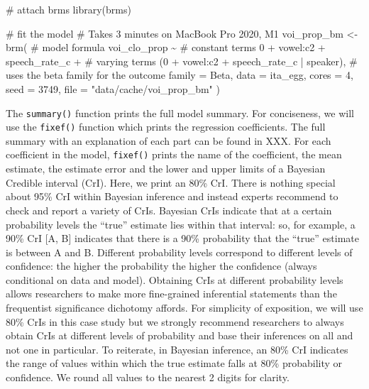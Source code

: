 \documentclass[
  authoryear,
  preprint,
  3p]{elsarticle}
\newenvironment{Shaded}{\begin{snugshade}}{\end{snugshade}}
\newcommand{\AttributeTok}[1]{\textcolor[rgb]{0.40,0.45,0.13}{#1}}
\newcommand{\CommentTok}[1]{\textcolor[rgb]{0.37,0.37,0.37}{#1}}
\newcommand{\DecValTok}[1]{\textcolor[rgb]{0.68,0.00,0.00}{#1}}
\newcommand{\FunctionTok}[1]{\textcolor[rgb]{0.28,0.35,0.67}{#1}}
\newcommand{\NormalTok}[1]{\textcolor[rgb]{0.00,0.23,0.31}{#1}}
\newcommand{\OtherTok}[1]{\textcolor[rgb]{0.00,0.23,0.31}{#1}}
\newcommand{\SpecialCharTok}[1]{\textcolor[rgb]{0.37,0.37,0.37}{#1}}
\newcommand{\StringTok}[1]{\textcolor[rgb]{0.13,0.47,0.30}{#1}}
\begin{document}
\begin{Shaded}
\begin{Highlighting}[]
\CommentTok{\# attach brms}
\FunctionTok{library}\NormalTok{(brms)}

\CommentTok{\# fit the model}
\CommentTok{\# Takes 3 minutes on MacBook Pro 2020, M1}
\NormalTok{voi\_prop\_bm }\OtherTok{\textless{}{-}} \FunctionTok{brm}\NormalTok{(}
  \CommentTok{\# model formula}
\NormalTok{  voi\_clo\_prop }\SpecialCharTok{\textasciitilde{}}
    \CommentTok{\# constant terms}
    \DecValTok{0} \SpecialCharTok{+}\NormalTok{ vowel}\SpecialCharTok{:}\NormalTok{c2 }\SpecialCharTok{+}\NormalTok{ speech\_rate\_c }\SpecialCharTok{+}
    \CommentTok{\# varying terms}
\NormalTok{    (}\DecValTok{0} \SpecialCharTok{+}\NormalTok{ vowel}\SpecialCharTok{:}\NormalTok{c2 }\SpecialCharTok{+}\NormalTok{ speech\_rate\_c }\SpecialCharTok{|}\NormalTok{ speaker),}
  \CommentTok{\# uses the beta family for the outcome}
  \AttributeTok{family =}\NormalTok{ Beta,}
  \AttributeTok{data =}\NormalTok{ ita\_egg,}
  \AttributeTok{cores =} \DecValTok{4}\NormalTok{,}
  \AttributeTok{seed =} \DecValTok{3749}\NormalTok{,}
  \AttributeTok{file =} \StringTok{"data/cache/voi\_prop\_bm"}
\NormalTok{)}
\end{Highlighting}
\end{Shaded}

The \texttt{summary()} function prints the full model summary. For
conciseness, we will use the \texttt{fixef()} function which prints the
regression coefficients. The full summary with an explanation of each
part can be found in XXX. For each coefficient in the model,
\texttt{fixef()} prints the name of the coefficient, the mean estimate,
the estimate error and the lower and upper limits of a Bayesian Credible
interval (CrI). Here, we print an 80\% CrI. There is nothing special
about 95\% CrI within Bayesian inference and instead experts recommend
to check and report a variety of CrIs. Bayesian CrIs indicate that at a
certain probability levels the ``true'' estimate lies within that
interval: so, for example, a 90\% CrI {[}A, B{]} indicates that there is
a 90\% probability that the ``true'' estimate is between A and B.
Different probability levels correspond to different levels of
confidence: the higher the probability the higher the confidence (always
conditional on data and model). Obtaining CrIs at different probability
levels allows researchers to make more fine-grained inferential
statements than the frequentist significance dichotomy affords. For
simplicity of exposition, we will use 80\% CrIs in this case study but
we strongly recommend researchers to always obtain CrIs at different
levels of probability and base their inferences on all and not one in
particular. To reiterate, in Bayesian inference, an 80\% CrI indicates
the range of values within which the true estimate falls at 80\%
probability or confidence. We round all values to the nearest 2 digits
for clarity.
\end{document}
